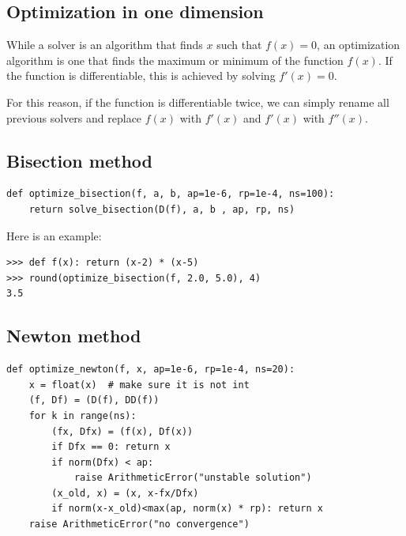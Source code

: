 \documentclass[justified, sixbynine]{tufte-book}
\def\ft{\small\tt}
\theoremstyle{plain}%
\newtheorem * {corollary}{Corollary}
\theoremstyle{definition}
\theoremstyle{remark}
\newtheorem * {remark}{Remark}
\newtheorem * {note}{Note}
\begin{document}
\begin{fullwidth}
\goodbreak\section{Optimization in one dimension}


While a solver is an algorithm that finds $x$ such that $f(x)=0$, an optimization algorithm is one that finds the maximum or minimum of the function $f(x)$. If the function is differentiable, this is achieved by solving $f'(x)=0$.

For this reason, if the function is differentiable twice, we can simply rename all previous solvers and replace $f(x)$ with $f'(x)$ and $f'(x)$ with $f''(x)$.

\goodbreak\subsection{Bisection method}


\begin{lstlisting}[caption={in file: {\ft nlib.py}}]
def optimize_bisection(f, a, b, ap=1e-6, rp=1e-4, ns=100):
    return solve_bisection(D(f), a, b , ap, rp, ns)
\end{lstlisting}

Here is an example:

\begin{lstlisting}[caption={in file: {\ft nlib.py}}]
>>> def f(x): return (x-2) * (x-5)
>>> round(optimize_bisection(f, 2.0, 5.0), 4)
3.5
\end{lstlisting}

\goodbreak\subsection{Newton method}


\begin{lstlisting}[caption={in file: {\ft nlib.py}}]
def optimize_newton(f, x, ap=1e-6, rp=1e-4, ns=20):
    x = float(x)  # make sure it is not int
    (f, Df) = (D(f), DD(f))
    for k in range(ns):
        (fx, Dfx) = (f(x), Df(x))
        if Dfx == 0: return x
        if norm(Dfx) < ap:
            raise ArithmeticError("unstable solution")
        (x_old, x) = (x, x-fx/Dfx)
        if norm(x-x_old)<max(ap, norm(x) * rp): return x
    raise ArithmeticError("no convergence")
\end{lstlisting}


\end{fullwidth}
\end{document}
